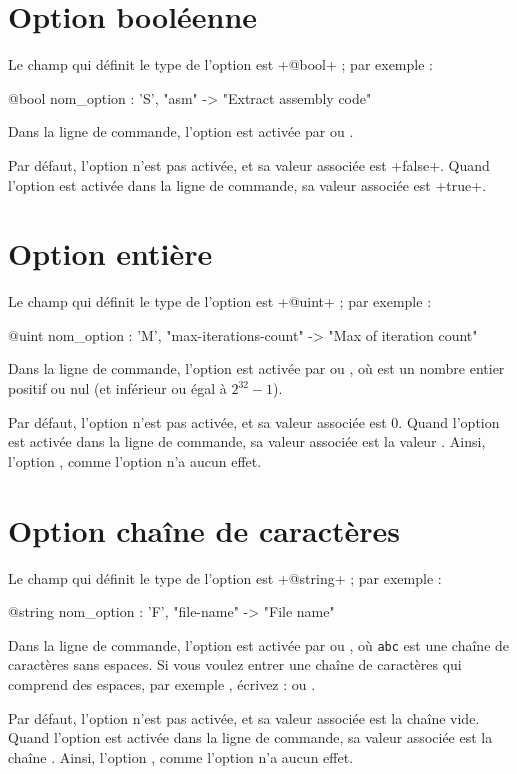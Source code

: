 \section{Option booléenne}

Le champ qui définit le type de l'option est \ggst+@bool+ ; par exemple :
\begin{galgas3}
  @bool nom_option : 'S', "asm" -> "Extract assembly code"
\end{galgas3}

Dans la ligne de commande, l'option est activée par  ou .

Par défaut, l'option n'est pas activée, et sa valeur associée est \ggst+false+. Quand l'option est activée dans la ligne de commande, sa valeur associée est \ggst+true+.








\section{Option entière}

Le champ qui définit le type de l'option est \ggst+@uint+ ; par exemple :
\begin{galgas3}
  @uint nom_option : 'M', "max-iterations-count" -> "Max of iteration count"
\end{galgas3}

Dans la ligne de commande, l'option est activée par  ou , où  est un nombre entier positif ou nul (et inférieur ou égal à $2^{32}-1$).

Par défaut, l'option n'est pas activée, et sa valeur associée est $0$. Quand l'option est activée dans la ligne de commande, sa valeur associée est la valeur . Ainsi, l'option , comme l'option  n'a aucun effet.










\section{Option chaîne de caractères}

Le champ qui définit le type de l'option est \ggst+@string+ ; par exemple :
\begin{galgas3}
  @string nom_option : 'F', "file-name" -> "File name"
\end{galgas3}

Dans la ligne de commande, l'option est activée par  ou , où \texttt{abc} est une chaîne de caractères sans espaces. Si vous voulez entrer une chaîne de caractères qui comprend des espaces, par exemple , écrivez :  ou .

Par défaut, l'option n'est pas activée, et sa valeur associée est la chaîne vide. Quand l'option est activée dans la ligne de commande, sa valeur associée est la chaîne . Ainsi, l'option , comme l'option  n'a aucun effet.



